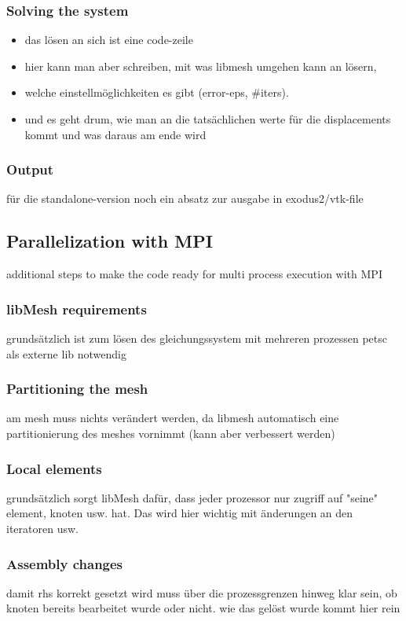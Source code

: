    
   
  \subsubsection{Solving the system}
   \begin{itemize}
   	\item das lösen an sich ist eine code-zeile
   	\item hier kann man aber schreiben, mit was libmesh umgehen kann an lösern,
    \item welche einstellmöglichkeiten es gibt (error-eps, \#iters).
    \item und es geht drum, wie man an die tatsächlichen werte für die displacements kommt und was daraus am ende wird
   \end{itemize}
   
   
   
  \subsubsection{Output}
   für die standalone-version noch ein absatz zur ausgabe in exodus2/vtk-file
 
 
 
 
 
 \subsection{Parallelization with MPI}
 additional steps to make the code ready for multi process execution with MPI\\
  \subsubsection{libMesh requirements}
   grundsätzlich ist zum lösen des gleichungssystem mit mehreren prozessen petsc als externe lib notwendig
  
  \subsubsection{Partitioning the mesh}
   am mesh muss nichts verändert werden, da libmesh automatisch eine partitionierung des meshes vornimmt (kann aber verbessert werden)
   
  \subsubsection{Local elements}
   grundsätzlich sorgt libMesh dafür, dass jeder prozessor nur zugriff auf "seine" element, knoten usw. hat. Das wird hier wichtig mit änderungen an den iteratoren usw.
  
  \subsubsection{Assembly changes}
   damit rhs korrekt gesetzt wird muss über die prozessgrenzen hinweg klar sein, ob knoten bereits bearbeitet wurde oder nicht. wie das gelöst wurde kommt hier rein\newline